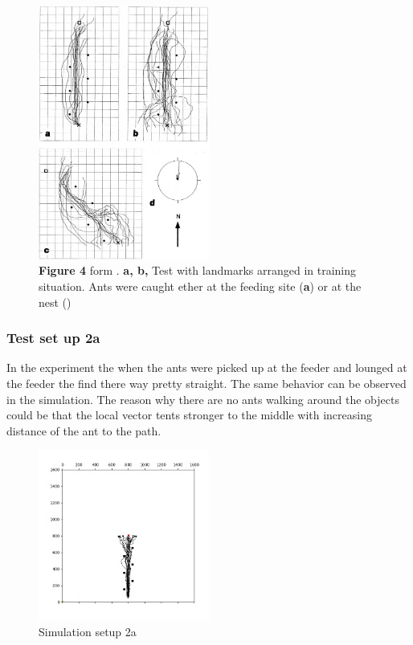 \documentclass[11pt]{article}
\begin{document}
\begin{figure}[H]
	\centering
	\includegraphics[width=0.5\textwidth]{p3.jpg}
	\caption{\textbf{Figure 4} form \cite{wehner}. \textbf{a, b,} Test with landmarks arranged in training situation. Ants were caught ether at the feeding site (\textbf{a}) or at the nest ()}
	\label{fig:second experiment}
\end{figure}

	\subsubsection{Test set up 2a}
In the experiment the when the ants were picked up at the feeder and lounged at the feeder the find there way pretty straight. 
The same behavior can be observed in the simulation. The reason why there are no ants walking around the objects could be that the local vector tents stronger to the middle with increasing distance of the ant to the path. 

\begin{figure}[H]
	\centering
	\includegraphics[width=0.5\textwidth]{test_2a.png}
	\caption{Simulation setup 2a}
	\label{fig:2a}
\end{figure}
\end{document}
